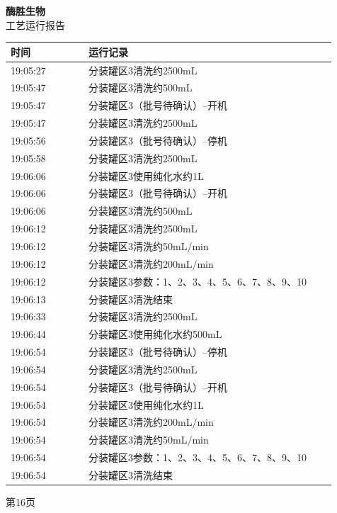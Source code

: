\documentclass[UTF8,10pt,a4paper,fontset=fandol]{ctexart}
\begin{document}
\hfill
\begin{minipage}[t]{0.48\linewidth}
\centering
\textbf{酶胜生物}\\[2pt]
工艺运行报告

\smallskip
\begin{tabular}{|p{0.22\linewidth}|p{0.70\linewidth}|}
\hline
时间 & 运行记录\\ \hline
19:05:27 & 分装罐区3清洗约2500mL\\ \hline
19:05:47 & 分装罐区3清洗约500mL\\ \hline
19:05:47 & 分装罐区3（批号待确认）--开机\\ \hline
19:05:47 & 分装罐区3清洗约2500mL\\ \hline
19:05:56 & 分装罐区3（批号待确认）--停机\\ \hline
19:05:58 & 分装罐区3清洗约2500mL\\ \hline
19:06:06 & 分装罐区3使用纯化水约1L\\ \hline
19:06:06 & 分装罐区3（批号待确认）--开机\\ \hline
19:06:06 & 分装罐区3清洗约500mL\\ \hline
19:06:12 & 分装罐区3清洗约2500mL\\ \hline
19:06:12 & 分装罐区3清洗约50mL/min\\ \hline
19:06:12 & 分装罐区3清洗约200mL/min\\ \hline
19:06:12 & 分装罐区3参数：1、2、3、4、5、6、7、8、9、10\\ \hline
19:06:13 & 分装罐区3清洗结束\\ \hline
19:06:33 & 分装罐区3清洗约2500mL\\ \hline
19:06:44 & 分装罐区3使用纯化水约500mL\\ \hline
19:06:54 & 分装罐区3（批号待确认）--停机\\ \hline
19:06:54 & 分装罐区3清洗约2500mL\\ \hline
19:06:54 & 分装罐区3（批号待确认）--开机\\ \hline
19:06:54 & 分装罐区3使用纯化水约1L\\ \hline
19:06:54 & 分装罐区3清洗约200mL/min\\ \hline
19:06:54 & 分装罐区3清洗约50mL/min\\ \hline
19:06:54 & 分装罐区3参数：1、2、3、4、5、6、7、8、9、10\\ \hline
19:06:54 & 分装罐区3清洗结束\\ \hline
\end{tabular}

\vspace{2pt}
第16页
\end{minipage}
\end{document}
